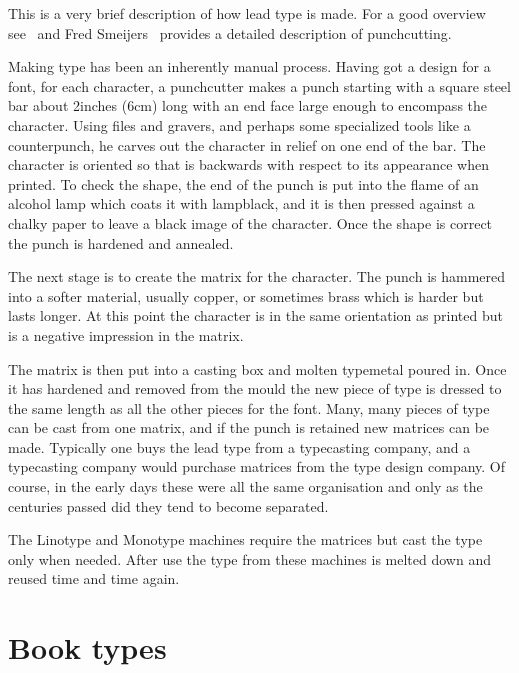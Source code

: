 \documentclass[10pt,a4paper,extrafontsizes]{memoir}
\begin{document}
\begin{paracol}{2}
\switchEng

    This is a very brief description of how lead type is made. For
a good overview see~\autocite{CHAPPELL99} and Fred Smeijers~\autocite{SMEIJERS96}
provides a detailed description of punchcutting.
 
    Making type has been an inherently manual process. Having got a design
for a font, for each character, a punchcutter makes a punch starting 
with a square steel bar about 2inches (6cm) long with an 
end face large enough to encompass the character. Using files and gravers,
and perhaps some specialized tools like a counterpunch, 
he carves out the character in relief on one end of the bar. The character
is oriented so that is backwards with respect to its appearance when printed.
To check the shape, the end of the punch is put into the flame of an alcohol
lamp which coats it with lampblack, and it is then pressed against a chalky 
paper to leave a black image of the character. Once the shape is correct 
the punch is hardened and annealed.

   The next stage is to create the matrix for the character. The punch is
hammered into a softer material, usually copper, or sometimes brass which
is harder but lasts longer. At this point the character is in the same
orientation as printed but is a negative impression in the matrix.

   The matrix is then put into a casting box and molten typemetal poured in.
Once it has hardened and removed from the mould the new piece of type is 
dressed to the same length as all the other pieces for the font. Many, many 
pieces of type can be cast from one matrix, and if the punch is retained new
matrices can be made. Typically one buys the lead type from a typecasting
company, and a typecasting company would purchase matrices from the type
design company. Of course, in the early days these were all the same 
organisation and only as the centuries passed did they tend to become
separated.

   The Linotype and Monotype machines 
require the matrices but cast the type only when needed. After use the type 
from these machines is melted down and reused time and time again.
\end{paracol}

\section{Book types}
\end{document}
